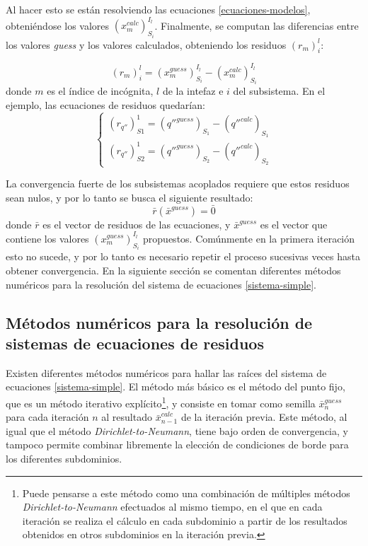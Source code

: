 Al hacer esto se están resolviendo las ecuaciones \ref{ecuaciones-modelos},
obteniéndose los valores $(x_{m}^{calc})_{S_i}^{I_l}$.
Finalmente, se computan las diferencias entre los valores \textit{guess} y los valores calculados, obteniendo los residuos $(r_m)_{i}^{l}$:

\begin{equation}
(r_m)_{i}^{l} = (x_{m}^{guess})_{S_i}^{I_l} - (x_{m}^{calc})_{S_i}^{I_l}
\label{ecuaciones-residuos}
\end{equation}
donde $m$ es el índice de incógnita, $l$ de la intefaz e $i$ del subsistema.
En el ejemplo, las ecuaciones de residuos quedarían:
\begin{equation}
\left\{\begin{matrix}
(r_{q''})_{S1}^{1}  = (q''^{ guess})_{S_1} - (q''^{calc})_{S_1} \\
(r_{q''})_{S2}^{1}  = (q''^{ guess})_{S_2} - (q''^{calc})_{S_2}
\end{matrix}\right.
\label{res_qq}
\end{equation}

La convergencia fuerte de los subsistemas acoplados requiere que estos residuos sean nulos, y por lo tanto se busca el siguiente resultado:
\begin{equation}
\bar{r}(\bar{x}^{guess})=\bar{0}
\label{sistema-simple}
\end{equation}
donde $\bar{r}$ es el vector de residuos de las ecuaciones,
y $\bar{x}^{guess}$ es el vector que contiene los valores $(x_m^{guess})_{S_i}^{I_l}$ propuestos.
Comúnmente en la primera iteración esto no sucede, y por lo tanto es necesario repetir el proceso sucesivas veces hasta obtener convergencia.
En la siguiente sección se comentan diferentes métodos numéricos para la resolución del sistema de ecuaciones \ref{sistema-simple}.

\subsection*{Métodos numéricos para la resolución de sistemas de ecuaciones de residuos}
\label{1:metodos}

Existen diferentes métodos numéricos para hallar las raíces del sistema de ecuaciones \ref{sistema-simple}.
El método más básico es el método del punto fijo, que es un método iterativo explícito\footnote{
Puede pensarse a este método como una combinación de múltiples métodos \textit{Dirichlet-to-Neumann} efectuados al mismo tiempo,
en el que en cada iteración se realiza el cálculo en cada subdominio a partir de los resultados obtenidos en otros subdominios en la iteración previa.
},
y consiste en tomar como semilla $\bar{x}^{guess}_n$ para cada iteración $n$ al resultado $\bar{x}^{calc}_{n-1}$ de la iteración previa.
Este método, al igual que el método \textit{Dirichlet-to-Neumann}, tiene bajo orden de convergencia,
y tampoco permite combinar libremente la elección de condiciones de borde para los diferentes subdominios.

